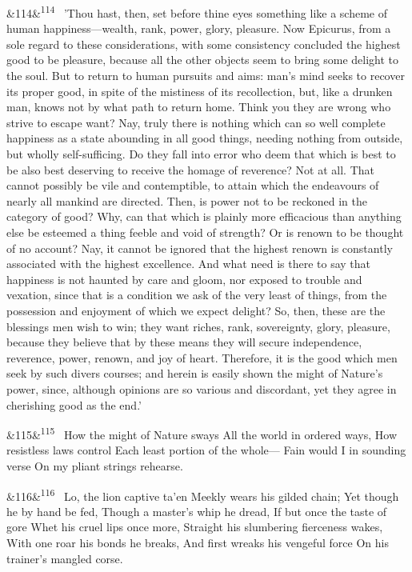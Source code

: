 \documentclass[12pt]{article}
\newcommand{\para}[1][]{\par\noindent\ifx&#1&\else\textsuperscript{\footnotesize #1}~\fi}
\begin{document}
\para[114] 'Thou hast, then, set before thine eyes something like a scheme of human happiness---wealth, rank, power, glory, pleasure. Now Epicurus, from a sole regard to these considerations, with some consistency concluded the highest good to be pleasure, because all the other objects seem to bring some delight to the soul. But to return to human pursuits and aims: man's mind seeks to recover its proper good, in spite of the mistiness of its recollection, but, like a drunken man, knows not by what path to return home. Think you they are wrong who strive to escape want? Nay, truly there is nothing which can so well complete happiness as a state abounding in all good things, needing nothing from outside, but wholly self-sufficing. Do they fall into error who deem that which is best to be also best deserving to receive the homage of reverence? Not at all. That cannot possibly be vile and contemptible, to attain which the endeavours of nearly all mankind are directed. Then, is power not to be reckoned in the category of good? Why, can that which is plainly more efficacious than anything else be esteemed a thing feeble and void of strength? Or is renown to be thought of no account? Nay, it cannot be ignored that the highest renown is constantly associated with the highest excellence. And what need is there to say that happiness is not haunted by care and gloom, nor exposed to trouble and vexation, since that is a condition we ask of the very least of things, from the possession and enjoyment of which we expect delight? So, then, these are the blessings men wish to win; they want riches, rank, sovereignty, glory, pleasure, because they believe that by these means they will secure independence, reverence, power, renown, and joy of heart. Therefore, it is the good which men seek by such divers courses; and herein is easily shown the might of Nature's power, since, although opinions are so various and discordant, yet they agree in cherishing good as the end.'

\para[115] How the might of Nature sways All the world in ordered ways, How resistless laws control Each least portion of the whole--- Fain would I in sounding verse On my pliant strings rehearse.

\para[116] Lo, the lion captive ta'en Meekly wears his gilded chain; Yet though he by hand be fed, Though a master's whip he dread, If but once the taste of gore Whet his cruel lips once more, Straight his slumbering fierceness wakes, With one roar his bonds he breaks, And first wreaks his vengeful force On his trainer's mangled corse.
\end{document}
